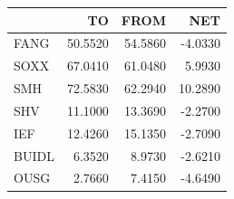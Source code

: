 \begin{tabular}{lrrr}
\toprule
 & TO & FROM & NET \\
\midrule
FANG & 50.5520 & 54.5860 & -4.0330 \\
SOXX & 67.0410 & 61.0480 & 5.9930 \\
SMH & 72.5830 & 62.2940 & 10.2890 \\
SHV & 11.1000 & 13.3690 & -2.2700 \\
IEF & 12.4260 & 15.1350 & -2.7090 \\
BUIDL & 6.3520 & 8.9730 & -2.6210 \\
OUSG & 2.7660 & 7.4150 & -4.6490 \\
\bottomrule
\end{tabular}

